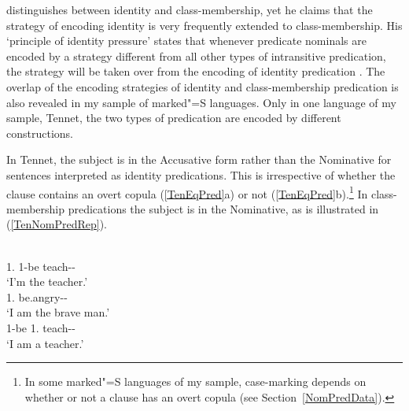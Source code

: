 \citet{Stassen:1997} distinguishes between identity and class-membership, yet he claims that the strategy of encoding identity is very frequently extended to class-membership. His `principle of identity pressure' states that whenever predicate nominals are encoded by a strategy different from all other types of intransitive predication, the strategy will be taken over from the encoding of identity predication \citep[111]{Stassen:1997}. 
The overlap of the encoding strategies of identity and class-membership predication is also revealed in my sample of marked"=S languages. 
Only in one language of my sample, Tennet, the two types of predication are encoded by different constructions. 

In Tennet, the subject is in the Accusative form rather than the Nominative for sentences interpreted as identity predications. 
This is irrespective of whether the clause contains an overt copula (\ref{TenEqPred}a) or not (\ref{TenEqPred}b).\footnote{In some marked"=S languages of my sample, case-marking depends on whether or not a clause has an overt copula (see Section~\ref{NomPredData}).} 
In class-membership predications the subject is in the Nominative, as is illustrated in (\ref{TenNomPredRep}).   

\begin{exe}\ex\label{TenEqPred}
\begin{xlist}
\ex\gll \textbf{}   \\
1\sg{}.\acc{} \am{} 1-be teach-\agnm{}-\sg{}\\
\glt `I'm the teacher.'
\ex\gll \textbf{} \\
1\sg{}.\acc{} be.angry-\agnm{}-\sg{}\\
\glt `I am the brave man.'
\ex\label{TenNomPredRep}\gll{}  \\
1-be 1\sg{}.\nom{} teach-\agnm{}-\sg{}\\
\glt `I am a teacher.'
\end{xlist}
\end{exe}

     


